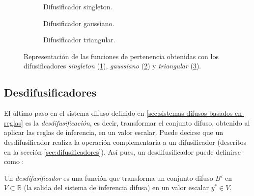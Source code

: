 \begin{figure}[H]
	\centering
	\begin{subfigure}[t]{\textwidth}
		\setlength\figureheight{4cm}
		\setlength\figurewidth{12cm}
		
		\caption{Difusificador singleton.}
		\label{fig:fuzzifier-singleton}
	\end{subfigure}
	
	\vspace{1 cm}
	\begin{subfigure}[t]{\textwidth}
		\setlength\figureheight{4cm}
		\setlength\figurewidth{12cm}
		
		\caption{Difusificador gaussiano.}
		\label{fig:fuzzifier-gaussian}
	\end{subfigure}
	
	\vspace{1 cm}
	\begin{subfigure}[t]{\textwidth}
		\setlength\figureheight{4cm}
		\setlength\figurewidth{12cm}
		
		\caption{Difusificador triangular.}
		\label{fig:fuzzifier-triangular}
	\end{subfigure}
		\caption{Representación de las funciones de pertenencia obtenidas con los difusificadores \emph{singleton} (\ref{fig:fuzzifier-singleton}), \emph{gaussiano} (\ref{fig:fuzzifier-gaussian}) y \emph{triangular} (\ref{fig:fuzzifier-triangular}).}
		\label{fig:fuzzifiers}
\end{figure}

\subsection{Desdifusificadores}\label{sec:desdifusificadores}
El último paso en el sistema difuso definido en \ref{sec:sistemas-difusos-basados-en-reglas} es la \emph{desdifusificación}, es decir, transformar el conjunto difuso, obtenido al aplicar las reglas de inferencia, en un valor escalar. Puede decirse que un desdifusificador realiza la operación complementaria a un difusificador (descritos en la sección \ref{sec:difusificadores}). Así pues, un desdifusificador puede definirse como \cite{wang1997}:

\begin{definition}
Un \emph{desdifusificador} es una función que transforma un conjunto difuso $B'$ en $V \subset \mathbb{R}$ (la salida del sistema de inferencia difusa) en un valor escalar $y^* \in V$.
\end{definition}

